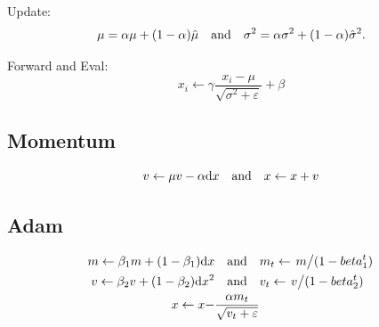\documentclass[a4paper,landscape]{article}
\begin{document}
\begin{tiny}
\begin{multicols}{4}
\begin{md}
			Update:
			\[
				\mu = \alpha\mu + (1-\alpha)\hat{\mu}
				\qand
				\sigma^2 = \alpha\sigma^2 + (1-\alpha)\hat{\sigma}^2
				.\]

			Forward and Eval:
			\[
				x_i\gets \gamma \frac{x_i-\mu}{\sqrt{\sigma^2+\varepsilon}}+\beta
			\]

			\subsection{Momentum}
			\[
				v\gets\mu v-\alpha\dd x \qand x\gets x+v
			\]

			\subsection{Adam}
			\[
				\begin{aligned}
					m\gets\beta_1 m+(1-\beta_1)\dd x
					           & \qand
					m_t \gets \flatfrac{m}{(1-beta_1^t)}
					\\
					v\gets\beta_2 v+(1-\beta_2)\dd x^2
					           & \qand
					v_t \gets \flatfrac{v}{(1-beta_2^t)}
					\\
					x \gets x- & \frac{\alpha m_t}{\sqrt{v_t+\varepsilon}}
				\end{aligned}
			\]
		\end{md}
	\end{multicols}
\end{tiny}
\end{document}
